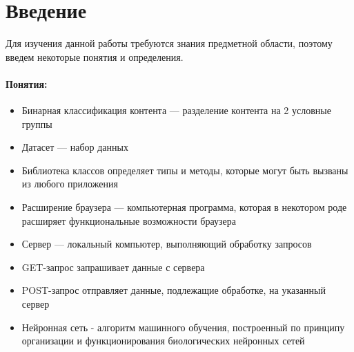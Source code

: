 \documentclass[14pt]{matmex-diploma}
\begin{document}
\maketitle
\tableofcontents

\section*{Введение} 

    Для изучения данной работы требуются знания предметной области, поэтому введем некоторые понятия и определения.
    
    \paragraph{Понятия:}
        \begin{itemize}
            \item Бинарная классификация контента — разделение контента на 2 условные группы
            \item Датасет — набор данных
            \item Библиотека классов определяет типы и методы, которые могут быть вызваны из любого приложения
            \item Расширение браузера — компьютерная программа, которая в некотором роде расширяет функциональные возможности браузера
            \item Сервер — локальный компьютер, выполняющий обработку запросов 
            \item GET-запрос запрашивает данные с сервера
            \item POST-запрос  отправляет данные, подлежащие обработке, на указанный сервер
            \item Нейронная сеть - алгоритм машинного обучения, построенный по принципу организации и функционирования биологических нейронных сетей \cite{wiki:nn}
        \end{itemize}
        
\end{document}
